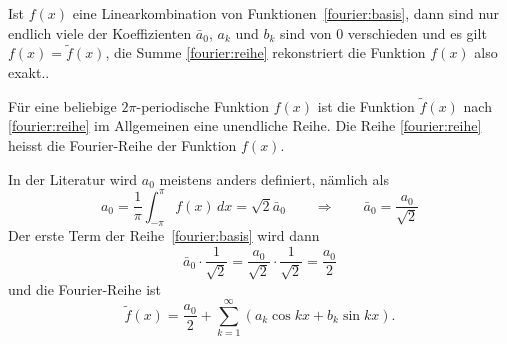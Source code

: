 Ist $f(x)$ eine Linearkombination von Funktionen~\eqref{fourier:basis},
dann sind nur endlich viele der Koeffizienten $\bar{a}_0$, $a_k$ und $b_k$
sind von $0$ verschieden und es gilt $f(x)=\tilde f(x)$, die Summe
\eqref{fourier:reihe} rekonstriert die Funktion $f(x)$ also exakt..

Für eine beliebige $2\pi$-periodische Funktion $f(x)$ ist die Funktion
$\tilde f(x)$ nach \eqref{fourier:reihe} im Allgemeinen eine unendliche
Reihe.
Die Reihe \eqref{fourier:reihe} heisst die Fourier-Reihe der Funktion 
$f(x)$.

In der Literatur wird $a_0$ meistens anders definiert, nämlich als
\[
a_0 = \frac1{\pi}\int_{-\pi}^{\pi} f(x)\,dx = \sqrt{2}\bar{a}_0
\qquad\Rightarrow\qquad
\bar{a}_0 = \frac{a_0}{\sqrt{2}}
\]
Der erste Term der Reihe~\eqref{fourier:basis} wird dann
\[
\bar{a}_0\cdot\frac1{\sqrt{2}}
=
\frac{a_0}{\sqrt{2}}\cdot\frac{1}{\sqrt{2}}
=
\frac{a_0}2
\]
und die Fourier-Reihe ist
\begin{equation}
\tilde f(x)
=
\frac{a_0}2
+
\sum_{k=1}^\infty (a_k\cos kx+b_k\sin kx).
\end{equation}

